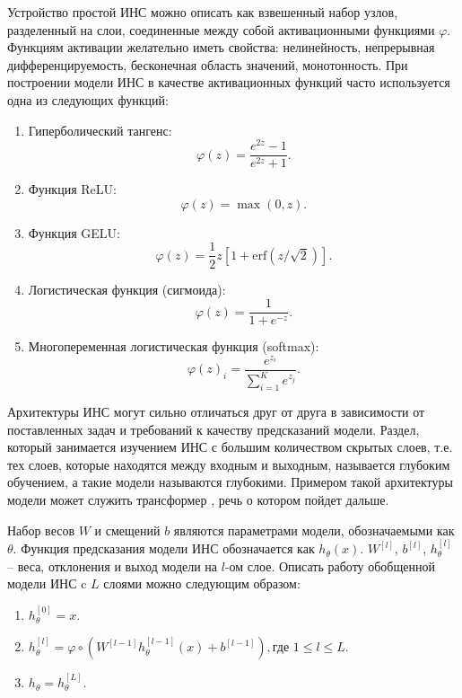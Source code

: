 Устройство простой ИНС можно описать как взвешенный набор узлов, разделенный на слои, соединенные между собой активационными функциями $\varphi$. Функциям активации желательно иметь свойства: нелинейность, непрерывная дифференцируемость, бесконечная область значений, монотонность. При построении модели ИНС в качестве активационных функций часто используется одна из следующих функций:
\begin{enumerate}
    \item Гиперболический тангенс:
          \begin{equation}
              \varphi(z) = \frac{e^{2z}-1}{e^{2z}+1}.
          \end{equation}
    \item Функция ReLU:
          \begin{equation}
              \varphi(z) = \max(0, z).
              \label{relu}
          \end{equation}
    \item Функция GELU:
          \begin{equation}
              \varphi(z) = \frac{1}{2}z\left[1+\text{erf}\left({z}/\sqrt{2}\right)\right].
              \label{gelu}
          \end{equation}
    \item Логистическая функция (сигмоида):
          \begin{equation}
              \varphi(z) = \frac{1}{1+e^{-z}}.
          \end{equation}
    \item Многопеременная логистическая функция (softmax):
          \begin{equation}
              \varphi(z)_i = \frac{e^{z_i}}{\sum_{i=1}^{K}e^{z_j}}.
          \end{equation}
\end{enumerate}

Архитектуры ИНС могут сильно отличаться друг от друга в зависимости от поставленных задач и требований к качеству предсказаний модели. Раздел, который занимается изучением ИНС с большим количеством скрытых слоев, т.е. тех слоев, которые находятся между входным и выходным, называется глубоким обучением, а такие модели называются глубокими. Примером такой архитектуры модели может служить  трансформер \cite{transformer-paper}, речь о котором пойдет дальше.

Набор весов $W$ и смещений $b$ являются параметрами модели, обозначаемыми как $\theta$. Функция предсказания модели ИНС обозначается как $h_\theta(x)$. $W^{[l]}$, $b^{[l]}$, $h_{\theta}^{[l]}$ -- веса, отклонения и выход модели на $l$-ом слое. Описать работу обобщенной модели ИНС c $L$ слоями можно следующим образом:
\begin{enumerate}
    \item $h_{\theta}^{[0]} = x$.
    \item $h_{\theta}^{[l]} = \varphi \circ \left(W^{[l-1]}h_{\theta}^{[l-1]}(x) + b^{[l-1]}\right), \text{где } 1 \le l \le L$.
    \item $h_{\theta} = h_{\theta}^{[L]}$.
\end{enumerate}

